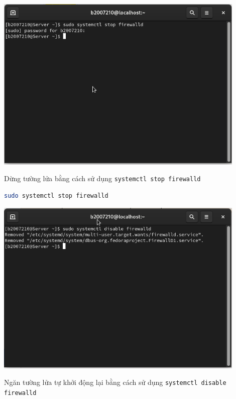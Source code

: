 \documentclass[a4paper, 11pt]{article}
\begin{document}
\begin{itemize}
          \begin{minipage}
              {\linewidth}
              \captionsetup{type=figure}
              \centering
              \includegraphics[width=12cm]{images/stop-firewalld.png}
              \caption{Dừng tường lửa bằng cách sử dụng \texttt{systemctl stop firewalld}}
              \label{figure:stop-firewalld}
          \end{minipage}

          \begin{lstlisting}[language=bash, caption=Dừng tường lửa]
sudo systemctl stop firewalld
\end{lstlisting}

          \begin{minipage}
              {\linewidth}
              \captionsetup{type=figure}
              \centering
              \includegraphics[width=12cm]{images/disable-firewalld.png}
              \caption{Ngăn tường lửa tự khởi động lại bằng cách sử dụng \texttt{systemctl disable firewalld}}
              \label{figure:disable-firewalld}
          \end{minipage}


\end{itemize}
\end{document}
